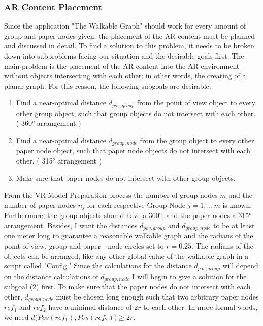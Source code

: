 \documentclass[12pt,a4paper,oneside,american,parskip=half]{article}
\begin{document}
\begin{justify}
\begin{normalsize}
\subsubsection{AR Content Placement}
Since the application "The Walkable Graph" should work for every amount of group and paper nodes given, the placement of the AR content must be planned and discussed in detail. To find a solution to this problem, it needs to be broken down into subproblems facing our situation and the desirable goals first.
The main problem is the placement of the AR content into the AR environment without objects intersecting with each other; in other words, the creating of a planar graph.
\newline
For this reason, the following subgoals are desirable:
\newline
\begin{enumerate}
    \item Find a near-optimal distance $d_{pov, group}$ from the point of view object to every other group object, such that group objects do not intersect with each other. ( 360° arrangement )
    \item Find a near-optimal distance $d_{group, node}$ from the group object to every other paper node object, such that paper node objects do not intersect with each other. ( 315° arrangement )
    \item Make sure that paper nodes do not intersect with other group objects.
\end{enumerate}
From the VR Model Preparation process the number of group nodes $m$ and the number of paper nodes $n_j$ for each respective Group Node $j = 1,..,m$ is known. Furthermore, the group objects should have a 360°, and the paper nodes a 315° arrangement.
\newline
Besides, I want the distances $d_{pov, group}$ and $d_{group, node}$ to be at least one meter long to guarantee a reasonable walkable graph and the radians of the point of view, group and paper - node circles set to $r = 0.25$. The radians of the objects can be arranged, like any other global value of the walkable graph in a script called "Config."
Since the calculations for the distance $d_{pov, group}$ will depend on the distance calculations of $d_{group, node}$ I will begin to give a solution for the subgoal (2) first.
To make sure that the paper nodes do not intersect with each other, $d_{group, node}$ must be chosen long enough such that two arbitrary paper nodes $ref_1$ and $ref_2$ have a minimal distance of $2r$ to each other. In more formal words, we need $d\big(Pos(ref_1), Pos(ref_2)\big) \ge 2r$.

\end{normalsize}
\end{justify}
\end{document}
